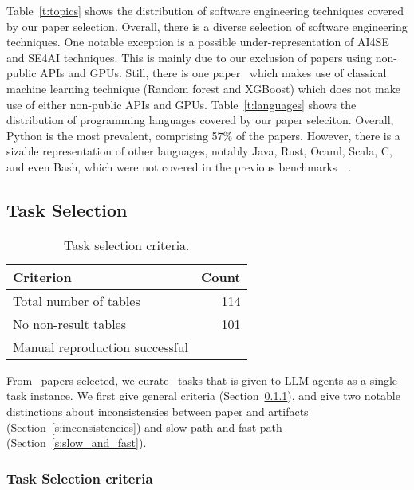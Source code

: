 Table~\ref{t:topics} shows the distribution of software engineering techniques covered by our paper selection.
Overall, there is a diverse selection of software engineering techniques.
One notable exception is a possible under-representation of AI4SE and SE4AI techniques.
This is mainly due to our exclusion of papers using non-public APIs and GPUs.
Still, there is one paper~\cite{DBLP:conf/kbse/LeeJL24} which makes use of classical machine learning technique (Random forest and XGBoost) which does not make use of either non-public APIs and GPUs.
Table~\ref{t:languages} shows the distribution of programming languages covered by our paper seleciton.
Overall, Python is the most prevalent, comprising 57\% of the papers.
However, there is a sizable representation of other languages, notably Java, Rust, Ocaml, Scala, C, and even Bash, which were not covered in the previous benchmarks~~\cite{DBLP:conf/emnlp/BoginYG0BCSK24, DBLP:journals/tmlr/SiegelKNSN24, DBLP:conf/acl/HuZLWPK25}.

\subsection{Task Selection}
\label{s:task_select}

\begin{table}[t]
  \caption{Task selection criteria.}
  \label{t:task_select}
  \centering
  \begin{tabular}{@{}l r@{}}
    \toprule
    Criterion & Count \\
    \midrule
    Total number of tables & 114 \\
    No non-result tables & 101 \\
    Manual reproduction successful & \tablesetsize \\
    \bottomrule
  \end{tabular}
\end{table}

From \papersetsize~papers selected, we curate \tablesetsize~tasks that is given to LLM agents as a single task instance.
We first give general criteria (Section~\ref{s:task_selection_criteria}), and give two notable distinctions about inconsistensies between paper and artifacts (Section~\ref{s:inconsistencies}) and slow path and fast path (Section~\ref{s:slow_and_fast}).

\subsubsection{Task Selection criteria}
\label{s:task_selection_criteria}

